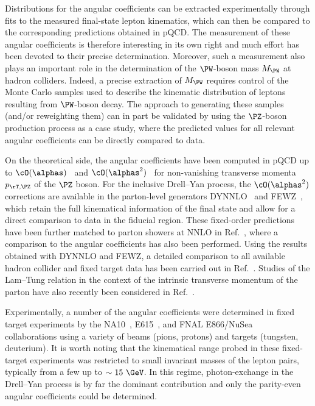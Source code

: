 Distributions for the angular coefficients can be extracted experimentally through 
fits to the measured final-state lepton kinematics, which can then be compared 
to the corresponding predictions obtained in pQCD.
%
The measurement of these angular coefficients is therefore interesting in its own right 
and much effort has been devoted to their precise determination.
%
Moreover, such a measurement also plays an important role 
in the determination of the $\PW$-boson mass $M_\PW$ at hadron colliders.
Indeed, a precise extraction of $M_\PW$ requires control of the Monte Carlo samples used to 
describe the kinematic distribution of leptons resulting from $\PW$-boson decay. The approach 
to generating these samples (and/or reweighting them) can in part be validated by using 
the  $\PZ$-boson production process as a case study, where the predicted values for all relevant angular coefficients 
can be directly compared to data.

On the theoretical side, the angular coefficients have been computed in pQCD up to $\cO(\alphas)$~\cite {Collins:1977iv,Lam:1978pu,Lam:1978zr,Lam:1980uc}
and $\cO(\alphas^2)$~\cite{Mirkes:1992hu,Mirkes:1994eb,Mirkes:1994dp} for non-vanishing transverse momenta $\ptz$ of the $\PZ$ boson.
For the inclusive Drell--Yan process, the $\cO(\alphas^2)$ corrections are available 
in the parton-level generators DYNNLO~\cite{Catani:2009sm} and FEWZ~\cite{Gavin:2010az},
which retain the full kinematical information of the final state and allow for a direct comparison to data in the fiducial region. 
These fixed-order predictions have been further matched to parton showers at NNLO in Ref.~\cite{Karlberg:2014qua}, 
where a comparison to the angular coefficients has also been performed.
Using the results obtained with DYNNLO and FEWZ, a detailed comparison 
to all available hadron collider and fixed target data has been carried out in Ref.~\cite{Lambertsen:2016wgj}. 
%
Studies of the Lam--Tung relation in the context of the intrinsic transverse momentum of the parton have 
also recently been considered in Ref.~\cite{Motyka:2016lta}.

Experimentally, a number of the angular coefficients were determined
in fixed target experiments by the NA10~\cite{Guanziroli:1987rp}, E615~\cite{Conway:1989fs},
and FNAL E866/NuSea~\cite{ Zhu:2006gx, Zhu:2008sj} collaborations 
using a variety of beams (pions, protons) and targets (tungsten, deuterium).
%
It is worth noting that the kinematical range probed in these fixed-target experiments was restricted to small invariant masses of the lepton pairs, 
typically from a few \GeV up to $\sim15~\GeV$.
In this regime, photon-exchange in the Drell--Yan process is by far the dominant contribution and
only the parity-even angular coefficients could be determined.


